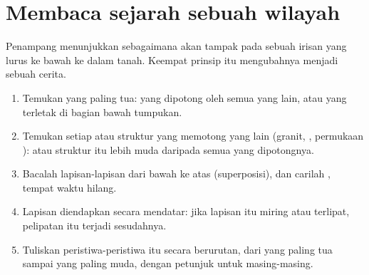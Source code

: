 \section{Membaca sejarah sebuah wilayah}

Penampang menunjukkan  sebagaimana akan tampak pada sebuah irisan
yang lurus ke bawah ke dalam tanah. Keempat prinsip itu mengubahnya menjadi
sebuah cerita.

\begin{method}\label{met:g7:geological-time:ordering}
\begin{enumerate}
  \item Temukan  yang paling tua:  yang dipotong oleh semua yang
        lain, atau yang terletak di bagian bawah tumpukan.
  \item Temukan setiap  atau struktur yang memotong yang lain
        (granit, , permukaan ):  atau struktur itu lebih
        muda daripada semua yang dipotongnya.
  \item Bacalah lapisan-lapisan dari bawah ke atas (superposisi), dan
        carilah , tempat waktu hilang.
  \item Lapisan diendapkan secara mendatar: jika lapisan itu miring atau
        terlipat, pelipatan itu terjadi sesudahnya.
  \item Tuliskan peristiwa-peristiwa itu secara berurutan, dari yang
        paling tua sampai yang paling muda, dengan petunjuk untuk
        masing-masing.
\end{enumerate}
\end{method}


